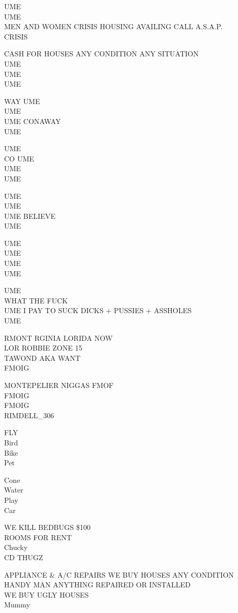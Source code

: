 \documentclass[10pt,letterpaper]{article}
\begin{document}
UME\\
UME\\
MEN AND WOMEN CRISIS HOUSING AVAILING CALL A.S.A.P.\\
CRISIS

CASH FOR HOUSES ANY CONDITION ANY SITUATION\\
UME\\
UME\\
UME

WAY UME\\
UME\\
UME CONAWAY\\
UME

UME\\
CO UME\\
UME\\
UME

UME\\
UME\\
UME BELIEVE\\
UME

UME\\
UME\\
UME\\
UME

UME\\
WHAT THE FUCK\\
UME I PAY TO SUCK DICKS + PUSSIES + ASSHOLES\\
UME

RMONT RGINIA LORIDA NOW\\
LOR ROBBIE ZONE 15\\
TAWOND AKA WANT\\
FMOIG

MONTEPELIER NIGGAS FMOF\\
FMOIG\\
FMOIG\\
RIMDELL\_306

FLY\\
Bird\\
Bike\\
Pet

Cone\\
Water\\
Play\\
Car

WE KILL BEDBUGS \$100\\
ROOMS FOR RENT\\
Chucky\\
CD THUGZ

APPLIANCE \& A/C REPAIRS WE BUY HOUSES ANY CONDITION\\
HANDY MAN ANYTHING REPAIRED OR INSTALLED\\
WE BUY UGLY HOUSES\\
Mummy
\end{document}

